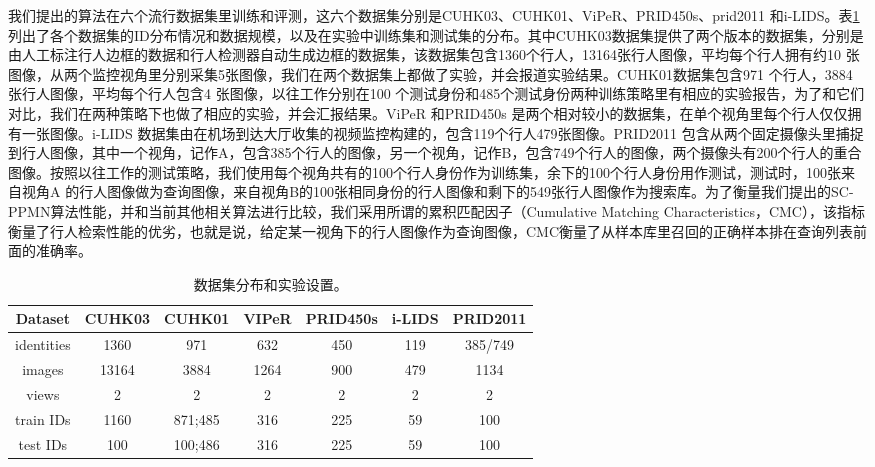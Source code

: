 我们提出的算法在六个流行数据集里训练和评测，这六个数据集分别是CUHK03\misscite、CUHK01、ViPeR、PRID450s、prid2011 和i-LIDS。表\ref{table:dataset}列出了各个数据集的ID分布情况和数据规模，以及在实验中训练集和测试集的分布。其中CUHK03数据集提供了两个版本的数据集，分别是由人工标注行人边框的数据和行人检测器自动生成边框的数据集，该数据集包含1360个行人，13164张行人图像，平均每个行人拥有约10 张图像，从两个监控视角里分别采集5张图像，我们在两个数据集上都做了实验，并会报道实验结果。CUHK01数据集包含971 个行人，3884 张行人图像，平均每个行人包含4 张图像，以往工作分别在100 个测试身份和485个测试身份两种训练策略里有相应的实验报告，为了和它们对比，我们在两种策略下也做了相应的实验，并会汇报结果。ViPeR 和PRID450s 是两个相对较小的数据集，在单个视角里每个行人仅仅拥有一张图像。i-LIDS 数据集由在机场到达大厅收集的视频监控构建的，包含119个行人479张图像。PRID2011 包含从两个固定摄像头里捕捉到行人图像，其中一个视角，记作A，包含385个行人的图像，另一个视角，记作B，包含749个行人的图像，两个摄像头有200个行人的重合图像。按照以往工作的测试策略，我们使用每个视角共有的100个行人身份作为训练集，余下的100个行人身份用作测试，测试时，100张来自视角A 的行人图像做为查询图像，来自视角B的100张相同身份的行人图像和剩下的549张行人图像作为搜索库。为了衡量我们提出的SC-PPMN算法性能，并和当前其他相关算法进行比较，我们采用所谓的累积匹配因子（Cumulative Matching Characteristics，CMC），该指标衡量了行人检索性能的优劣，也就是说，给定某一视角下的行人图像作为查询图像，CMC衡量了从样本库里召回的正确样本排在查询列表前面的准确率。
\begin{table}
	\centering
	\caption{数据集分布和实验设置。}
	\begin{tabular}{c|cccccc}
		\toprule
		Dataset    & CUHK03\misscite & CUHK01  & VIPeR & PRID450s & i-LIDS & PRID2011 \\
		\hline
		identities & 1360            & 971     & 632   & 450      & 119    & 385/749  \\
		images     & 13164           & 3884    & 1264  & 900      & 479    & 1134     \\
		views      & 2               & 2       & 2     & 2        & 2      & 2        \\
		train IDs  & 1160            & 871;485 & 316   & 225      & 59     & 100      \\
		test IDs   & 100             & 100;486 & 316   & 225      & 59     & 100      \\
		\bottomrule
	\end{tabular}
	\label{table:dataset}
\end{table}

